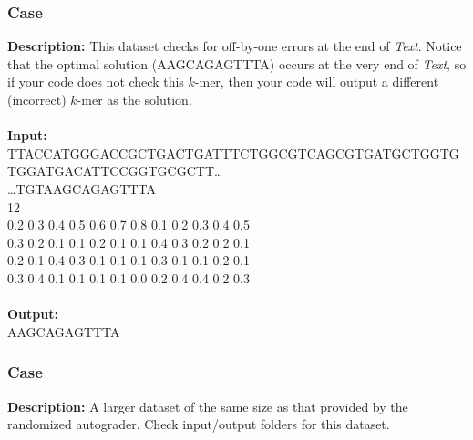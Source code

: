 \documentclass{article}
\newcommand{\code}[1]{{\fontfamily{pcr}\selectfont #1}}
\begin{document}
\subsubsection*{Case }
\hline \vspace{5}
\textbf{Description:} This dataset checks for off-by-one errors at the end of \emph{Text}. Notice that the optimal solution (\code{AAGCAGAGTTTA}) occurs at the very end of \emph{Text}, so if your code does not check this $k$-mer, then your code will output a different (incorrect) $k$-mer as the solution.\\ \\
\noindent \textbf{Input:}\\
\code{TTACCATGGGACCGCTGACTGATTTCTGGCGTCAGCGTGATGCTGGTGTGGATGACATTCCGGTGCGCTT\dots\\\dots TGTAAGCAGAGTTTA\\12\\0.2 0.3 0.4 0.5 0.6 0.7 0.8 0.1 0.2 0.3 0.4 0.5\\0.3 0.2 0.1 0.1 0.2 0.1 0.1 0.4 0.3 0.2 0.2 0.1\\0.2 0.1 0.4 0.3 0.1 0.1 0.1 0.3 0.1 0.1 0.2 0.1\\0.3 0.4 0.1 0.1 0.1 0.1 0.0 0.2 0.4 0.4 0.2 0.3}\\ \\
\noindent \textbf{Output:}\\
\code{AAGCAGAGTTTA}

\subsubsection*{Case }
\hline \vspace{5}
\textbf{Description:} A larger dataset of the same size as that provided by the randomized autograder. Check input/output folders for this dataset.\\ \\
\pagebreak
\end{document}
